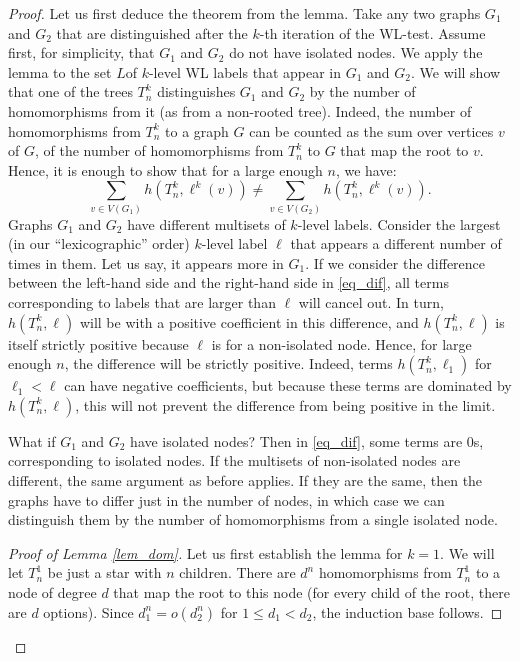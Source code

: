 \documentclass{article}
\begin{document}
\begin{proof}
    
    Let us first deduce the theorem from the lemma. Take any two graphs $G_1$ and $G_2$ that are distinguished after the $k$-th iteration of the WL-test.  Assume first, for simplicity, that $G_1$ and $G_2$ do not have isolated nodes.
    We apply the lemma to the set $L$of $k$-level WL labels that appear in $G_1$ and $G_2$. We will show that one of the trees $T^k_n$ distinguishes $G_1$ and $G_2$ by the number of homomorphisms from it (as from a non-rooted tree). Indeed, the number of homomorphisms from $T^k_n$ to a graph $G$ can be counted as the sum over vertices $v$ of $G$, of the number of homomorphisms from $T^k_n$ to $G$ that map the root to $v$. Hence, it is enough to show that for a large enough $n$, we have:
    \begin{equation}
    \label{eq_dif}
    \sum\limits_{v\in V(G_1)} h(T^k_n,\ell^k(v)) \neq \sum\limits_{v\in V(G_2)} h(T^k_n,\ell^k(v)). 
    \end{equation}
    Graphs $G_1$ and $G_2$ have different multisets of $k$-level labels. Consider the largest (in our ``lexicographic'' order) $k$-level label $\ell$ that appears a different number of times in them. Let us say, it appears more in $G_1$. If we consider the difference between the left-hand side and the right-hand side in \eqref{eq_dif}, all terms corresponding to labels that are larger than $\ell$ will cancel out. In turn, $h(T_n^k, \ell)$ will be with a positive coefficient in this difference, and $h(T_n^k,\ell)$ is itself strictly positive because $\ell$ is for a non-isolated node. Hence, for large enough $n$, the difference will be strictly positive. Indeed, terms $h(T_n^k, \ell_1)$ for $\ell_1 < \ell$ can have negative coefficients, but because these terms are dominated by  $h(T_n^k, \ell)$, this will not prevent the difference from being positive in the limit.

    What if $G_1$ and $G_2$ have isolated nodes? Then in \eqref{eq_dif}, some terms are 0s, corresponding to isolated nodes. If the multisets of non-isolated nodes are different, the same argument as before applies. If they are the same, then the graphs have to differ just in the number of nodes, in which case we can distinguish them by the number of homomorphisms from a single isolated node.


    \begin{proof}[Proof of Lemma \ref{lem_dom}]
        Let us first establish the lemma for $k = 1$. We will let $T^1_n$ be just a star with $n$ children. There are $d^n$ homomorphisms from $T^1_n$ to a node of degree $d$ that map the root to this node (for every child of the root, there are $d$ options). Since $d_1^n = o(d_2^n)$ for $1\le d_1 < d_2$, the induction base follows.


\end{proof}
\end{proof}
\end{document}
